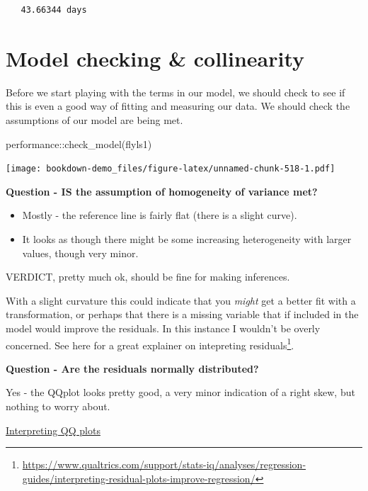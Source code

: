 \documentclass[
]{book}
\newenvironment{Shaded}{\begin{snugshade}}{\end{snugshade}}
\newcommand{\FunctionTok}[1]{\textcolor[rgb]{0.00,0.00,0.00}{#1}}
\newcommand{\NormalTok}[1]{#1}
\newcommand{\SpecialCharTok}[1]{\textcolor[rgb]{0.00,0.00,0.00}{#1}}
\begin{document}
\begin{verbatim}
   43.66344 days
\end{verbatim}

\hypertarget{model-checking-collinearity}{%
\section{Model checking \& collinearity}\label{model-checking-collinearity}}

Before we start playing with the terms in our model, we should check to see if this is even a good way of fitting and measuring our data. We should check the assumptions of our model are being met.

\begin{Shaded}
\begin{Highlighting}[]
\NormalTok{performance}\SpecialCharTok{::}\FunctionTok{check\_model}\NormalTok{(flyls1)}
\end{Highlighting}
\end{Shaded}

\texttt{[image: bookdown-demo\_files/figure-latex/unnamed-chunk-518-1.pdf]}

\textbf{Question - IS the assumption of homogeneity of variance met?}

\begin{itemize}
\item
  Mostly - the reference line is fairly flat (there is a slight curve).
\item
  It looks as though there might be some increasing heterogeneity with larger values, though very minor.
\end{itemize}

VERDICT, pretty much ok, should be fine for making inferences.

With a slight curvature this could indicate that you \emph{might} get a better fit with a transformation, or perhaps that there is a missing variable that if included in the model would improve the residuals. In this instance I wouldn't be overly concerned. See here for a great explainer on intepreting residuals\footnote{\url{https://www.qualtrics.com/support/stats-iq/analyses/regression-guides/interpreting-residual-plots-improve-regression/}}.

\textbf{Question - Are the residuals normally distributed?}

Yes - the QQplot looks pretty good, a very minor indication of a right skew, but nothing to worry about.

\protect\hyperlink{what-is-a-quantile-quantile-qq-plot}{Interpreting QQ plots}
\end{document}

